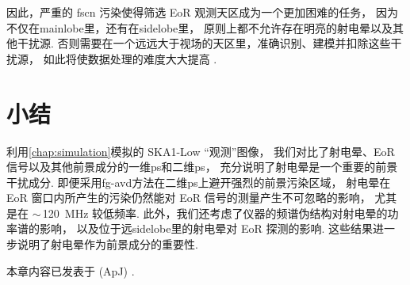 因此，严重的 \ac{fscn} 污染使得筛选 EoR 观测天区成为一个更加困难的任务，
因为不仅在\ac{mainlobe}里，还有在\ac{sidelobe}里，
原则上都不允许存在明亮的射电晕以及其他干扰源.
否则需要在一个远远大于视场的天区里，准确识别、建模并扣除这些干扰源，
如此将使数据处理的难度大大提高 \cite{pober2013,pober2016}.


\section{小结}

利用\autoref{chap:simulation}模拟的 SKA1-Low \enquote{观测}图像，
我们对比了射电晕、EoR 信号以及其他前景成分的一维\ac{ps}和二维\ac{ps}，
充分说明了射电晕是一个重要的前景干扰成分.
即便采用\ac{fg-avd}方法在二维\ac{ps}上避开强烈的前景污染区域，
射电晕在 EoR 窗口内所产生的污染仍然能对 EoR 信号的测量产生不可忽略的影响，
尤其是在 $\sim$\,\SI{120}{\MHz} 较低频率.
此外，我们还考虑了仪器的频谱伪结构对射电晕的功率谱的影响，
以及位于远\ac{sidelobe}里的射电晕对 EoR 探测的影响.
这些结果进一步说明了射电晕作为前景成分的重要性.

本章内容已发表于 \apj{} (ApJ) \cite{li.halo}.


